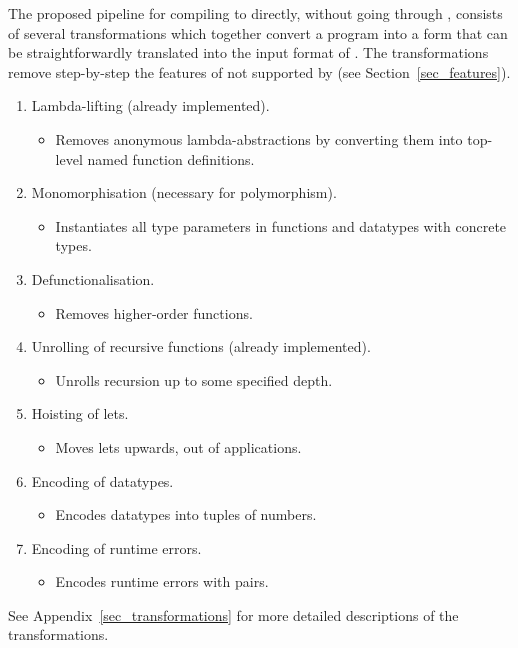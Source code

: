 \documentclass[final]{msc}
\begin{document}
The proposed pipeline for compiling \Juvix{} to \VampIR{} directly, without
going through \Geb{}, consists of several \JuvixCore{} transformations which
together convert a \JuvixCore{} program into a form that can be
straightforwardly translated into the input format of \VampIR{}. The
transformations remove step-by-step the features of \JuvixCore{} not
supported by \VampIR{} (see Section~\ref{sec_features}).
\begin{enumerate}
\item Lambda-lifting (already implemented).
  {\small
  \begin{itemize}
  \item Removes anonymous lambda-abstractions by converting them into
    top-level named function definitions.
  \end{itemize} }
\item Monomorphisation (necessary for polymorphism).
  {\small
    \begin{itemize}
    \item Instantiates all type parameters in functions and datatypes with concrete types.
  \end{itemize} }
\item Defunctionalisation.
  {\small
    \begin{itemize}
    \item Removes higher-order functions.
  \end{itemize} }
\item Unrolling of recursive functions (already implemented).
  {\small
    \begin{itemize}
    \item Unrolls recursion up to some specified depth.
  \end{itemize} }
\item Hoisting of lets.
  {\small
    \begin{itemize}
    \item Moves lets upwards, out of applications.
  \end{itemize} }
\item Encoding of datatypes.
  {\small
    \begin{itemize}
    \item Encodes datatypes into tuples of numbers.
  \end{itemize} }
\item Encoding of runtime errors.
  {\small
    \begin{itemize}
    \item Encodes runtime errors with pairs.
  \end{itemize} }
\end{enumerate}
See Appendix~\ref{sec_transformations} for more detailed descriptions
of the transformations.
\end{document}
